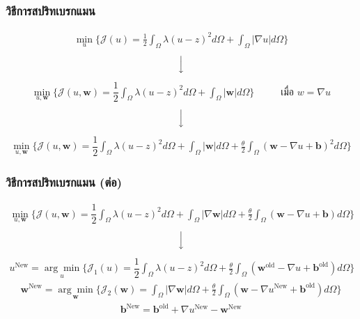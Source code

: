 \documentclass[xcolor=dvipsnames, xetex,serif]{beamer}
\numberwithin{equation}{section}
\begin{document}
    \begin{frame}
        \frametitle{วิธีการสปริทเบรกแมน}
        \begin{align*}
            \min_{u} \{ \mathcal{J}(u) = \frac{1}{2} \int_{\Omega}\lambda (u-z)^2 d\Omega +  \int_{\Omega}  |\nabla u|  d\Omega \}
        \end{align*}
        $$ \Big \downarrow$$
		\begin{align*}
		    \min_{u,\boldsymbol{w}} \{ \mathcal{J}(u,\boldsymbol{w}) = \dfrac{1}{2} \int_{\Omega} \lambda(u-z)^2 d\Omega +  \int_{\Omega}  |\boldsymbol{w}| d\Omega \} \hspace{1cm}\text{ เมื่อ } w = \nabla u
        \end{align*}
        $$ \Big \downarrow$$
		\begin{align*}
		    \min_{u,\boldsymbol{w}} \{ \mathcal{J}(u,\boldsymbol{w}) = \dfrac{1}{2} \int_{\Omega} \lambda(u-z)^2 d\Omega +  \int_{\Omega}  |\boldsymbol{w}|  d\Omega + \frac{\theta}{2} \int_{\Omega} (\boldsymbol{w} - \nabla u + \boldsymbol{b})^2 d\Omega \}
        \end{align*}
        \let\thefootnote\relax{}			
	\end{frame}  	
    \begin{frame}
        \frametitle{วิธีการสปริทเบรกแมน (ต่อ)}
            \begin{align*}
        \min_{u,\boldsymbol{w}} \{ \mathcal{J}(u,\boldsymbol{w}) = \dfrac{1}{2} \int_{\Omega} \lambda(u-z)^2 d\Omega +  \int_{\Omega}  |\nabla \boldsymbol{w}|  d\Omega + \frac{\theta}{2} \int_{\Omega} (\boldsymbol{w} - \nabla u + \boldsymbol{b}) d\Omega \}
        \end{align*}
        $$ \Big \downarrow$$
        \begin{align*}
        u^{\text{New}}=\underset{u}{\arg\min} \{ \mathcal{J}_1(u) = \dfrac{1}{2} \int_{\Omega} \lambda(u-z)^2 d\Omega + \frac{\theta}{2} \int_{\Omega} (\boldsymbol{w}^{\text{old}} - \nabla u + \boldsymbol{b}^{\text{old}}) d\Omega \}
        \end{align*}
        \begin{align*}
        \boldsymbol{w}^{\text{New}}=\underset{\boldsymbol{w}}{\arg\min} \{ \mathcal{J}_2(\boldsymbol{w}) = \int_{\Omega}  |\nabla \boldsymbol{w}|  d\Omega  + \frac{\theta}{2} \int_{\Omega} (\boldsymbol{w} - \nabla u^{\text{New}} + \boldsymbol{b}^{\text{old}}) d\Omega \}
        \end{align*}
        \begin{align*}
        \boldsymbol{b}^{\text{New}}=\boldsymbol{b}^{\text{old}}+\nabla u^{\text{New}}-\boldsymbol{w}^{\text{New}}
        \end{align*}
    \end{frame}  
\end{document}
